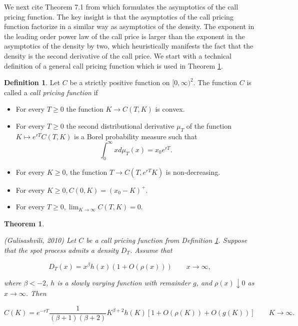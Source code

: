 \documentclass[12pt,twoside]{article}
\theoremstyle{plain}
\theoremstyle{plain}
\newtheorem{theorem}[proposition]{Theorem}
\theoremstyle{definition}
\newtheorem{definition}[proposition]{Definition}
\theoremstyle{remark}
\numberwithin{equation}{section}
\begin{document}
We next cite Theorem 7.1 from \cite{G10} which formulates the asymptotics of the call pricing function. The key insight is that the asymptotics of the call pricing function factorize in a similar way as asymptotics of the density. The exponent in the leading order power law of the call price is larger than the exponent in the asymptotics of the density by two, which heuristically manifests the fact that the density is the second derivative of the call price. We start with a technical definition of a general call pricing function which is used in Theorem \ref{theorem: gulisashvili call price}.

\begin{definition}
\label{def: call pricing function}
Let $C$ be a strictly positive function on $[0, \infty)^2$. The function $C$ is called a \emph{call pricing function} if

\begin{itemize}
    \item For every \(T \geq 0\) the function \(K \rightarrow C(T, K)\) is convex.
    \item For every $T \geq 0$ the second distributional derivative $\mu_T$ of the function $K \mapsto e^{r T} C(T, K)$ is a Borel probability measure such that $$\int_{0}^{\infty} x d \mu_{T}(x)=x_{0} e^{r T}.$$
    \item For every \(K \geq 0\), the function \(T \rightarrow C\left(T, e^{r T} K\right)\) is non-decreasing.
    \item For every \(K \geq 0, C(0, K)=\left(x_{0}-K\right)^{+}\).
    \item For every \(T \geq 0, \lim _{K \rightarrow \infty} C(T, K)=0\).
\end{itemize}

\end{definition}

\begin{theorem}
\label{theorem: gulisashvili call price}

(Gulisashvili, 2010) Let $C$ be a call pricing function from Definition \ref{def: call pricing function}. Suppose that the spot process admits a density $D_T$. Assume that

$$
D_T(x) = x^\beta h(x) (1 + O(\rho(x))) \qquad x \rightarrow \infty,
$$

where $\beta < -2$, $h$ is a slowly varying function with remainder $g$, and $\rho(x)\downarrow 0$ as $x \rightarrow \infty$. Then

$$
C(K)=e^{-r T} \frac{1}{(\beta+1)(\beta+2)} K^{\beta+2} h(K)[1+O(\rho(K))+O(g(K))] \qquad K\rightarrow \infty.
$$

\end{theorem}
\end{document}

